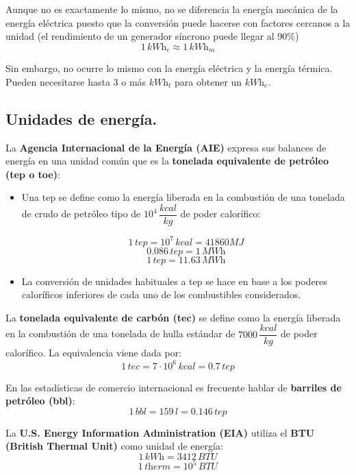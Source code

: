 			Aunque no es exactamente lo mismo, no se diferencia la energía mecánica de la energía eléctrica
			puesto que la conversión puede hacerse con factores cercanos a la unidad (el rendimiento de un
			generador síncrono puede llegar al 90\%)
			\[1\, \textit{kWh}_e \approx 1\, \textit{kWh}_m\]
			
			Sin embargo, no ocurre lo mismo con la energía eléctrica y la energía térmica. Pueden necesitarse
			hasta 3 o más $\textit{kWh}_t$ para obtener un $\textit{kWh}_e$.
			
		\subsection{Unidades de energía.}
			La \textbf{Agencia Internacional de la Energía (AIE)} expresa sus balances de energía en una unidad
			común que es la \textbf{tonelada equivalente de petróleo (tep o toe)}:
			\begin{itemize}
				\item Una tep se define como la energía liberada en la combustión de una tonelada de crudo de
				petróleo tipo de $10^4 \, \dfrac{\textit{kcal}}{\textit{kg}}$ de poder calorífico:
				
				\[1\,\textit{tep} = 10^7\,\textit{kcal}=41860\textit{MJ}\]
				\[0.086\,\textit{tep} = 1\, \textit{MWh}\]
				\[1\,\textit{tep} = 11.63\, \textit{MWh}\]
				
				\item La conversión de unidades habituales a tep se hace en base a los poderes caloríficos inferiores
				de cada uno de los combustibles considerados.
			\end{itemize}
			
			La \textbf{tonelada equivalente de carbón (tec)} se define como la energía liberada en la combustión de
			una tonelada de hulla estándar de $7000 \, \dfrac{\textit{kcal}}{\textit{kg}}$ de poder calorífico. La equivalencia viene dada por: 
			\[1\,\textit{tec}=7\cdot10^6\,\textit{kcal} = 0.7\,\textit{tep}\]
			
			En las estadísticas de comercio internacional es frecuente hablar de \textbf{barriles de petróleo (bbl)}:
			\[1\,\textit{bbl} = 159\,\textit{l} = 0.146\,\textit{tep}\]
			
			La \textbf{U.S. Energy Information Administration (EIA)} utiliza el \textbf{BTU (British Thermal Unit)} como unidad de energía:
			\[1\,\textit{kWh} = 3412\,\textit{BTU}\]
			\[1\,\textit{therm} = 10^5\,\textit{BTU}\]
			
